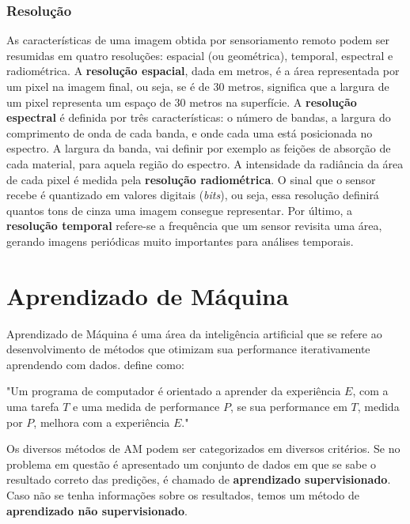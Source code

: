 \subsubsection{Resolução}\label{resolucao}

As características de uma imagem obtida por sensoriamento remoto podem
ser resumidas em quatro resoluções: espacial (ou geométrica), temporal,
espectral e radiométrica. A \textbf{resolução espacial}, dada em metros,
é a área representada por um pixel na imagem final, ou seja, se é de 30
metros, significa que a largura de um pixel representa um espaço de 30
metros na superfície. A \textbf{resolução espectral} é definida por três
características: o número de bandas, a largura do comprimento de onda de
cada banda, e onde cada uma está posicionada no espectro. A largura da
banda, vai definir por exemplo as feições de absorção de cada material,
para aquela região do espectro. A intensidade da radiância da área de
cada pixel é medida pela \textbf{resolução radiométrica}. O sinal que o
sensor recebe é quantizado em valores digitais (\emph{bits}), ou seja,
essa resolução definirá quantos tons de cinza uma imagem consegue
representar. Por último, a \textbf{resolução temporal} refere-se a
frequência que um sensor revisita uma área, gerando imagens periódicas
muito importantes para análises temporais. \cite{meneses2012introduccao}

\section{Aprendizado de Máquina}\label{aprendizado-de-maquina}

Aprendizado de Máquina é uma área da inteligência artificial que
se refere ao desenvolvimento de métodos que otimizam sua performance
iterativamente aprendendo com dados. \cite[p. 2]{mitchell1997machine} define como:

\begin{citacao}
"Um programa de computador é orientado a aprender da experiência $E$, com
a uma tarefa $T$ e uma medida de performance $P$, se sua performance em
$T$, medida por $P$, melhora com a experiência $E$."
\end{citacao}

Os diversos métodos de AM podem ser categorizados em diversos
critérios. Se no problema em questão é apresentado um conjunto de dados
em que se sabe o resultado correto das predições, é chamado de
\textbf{aprendizado supervisionado}. Caso não se tenha informações sobre
os resultados, temos um método de \textbf{aprendizado não
supervisionado}.

